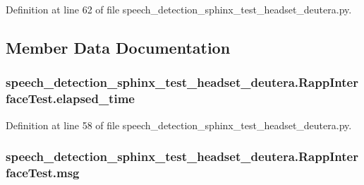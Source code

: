 Definition at line 62 of file speech\-\_\-detection\-\_\-sphinx\-\_\-test\-\_\-headset\-\_\-deutera.\-py.



\subsection{Member Data Documentation}
\hypertarget{classspeech__detection__sphinx__test__headset__deutera_1_1RappInterfaceTest_acb0f6d5f25a2a9fea216ee8996947bf0}{
\subsubsection[{elapsed\-\_\-time}]{\setlength{\rightskip}{0pt plus 5cm}speech\-\_\-detection\-\_\-sphinx\-\_\-test\-\_\-headset\-\_\-deutera.\-Rapp\-Interface\-Test.\-elapsed\-\_\-time}}\label{classspeech__detection__sphinx__test__headset__deutera_1_1RappInterfaceTest_acb0f6d5f25a2a9fea216ee8996947bf0}


Definition at line 58 of file speech\-\_\-detection\-\_\-sphinx\-\_\-test\-\_\-headset\-\_\-deutera.\-py.

\hypertarget{classspeech__detection__sphinx__test__headset__deutera_1_1RappInterfaceTest_ab5d6871c58a8e8bde31f192267a5bfe5}{
\subsubsection[{msg}]{\setlength{\rightskip}{0pt plus 5cm}speech\-\_\-detection\-\_\-sphinx\-\_\-test\-\_\-headset\-\_\-deutera.\-Rapp\-Interface\-Test.\-msg}}\label{classspeech__detection__sphinx__test__headset__deutera_1_1RappInterfaceTest_ab5d6871c58a8e8bde31f192267a5bfe5}


